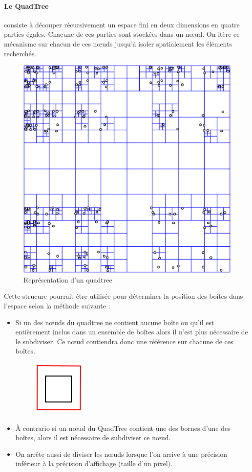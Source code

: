 \paragraph{Le QuadTree}\label{par:QT}consiste à découper récursivement un espace fini en deux dimensions en quatre parties égales. Chacune de ces parties sont stockées dans un nœud. On itère ce mécanisme sur chacun de ces nœuds jusqu'à isoler spatialement les éléments recherchés.
\begin{figure}[htbp]
\centering
\includegraphics[scale=0.50]{quadtree}
\caption{Représentation d'un quadtree}
\end{figure}
Cette strucure pourrait être utilisée pour déterminer la position des boîtes dans l'espace selon la méthode suivante :
\begin{itemize}
\item []Si un des nœuds du quadtree ne contient aucune boîte ou qu'il est entièrement inclus dans un ensemble de boîtes alors il n'est plus nécessaire de le subdiviser. Ce nœud contiendra donc une référence sur chacune de ces boîtes.
\begin{figure}[htbp]
\centering
\includegraphics[scale=0.20]{img/QT1}
\end{figure}
\item \`A contrario si un nœud du QuadTree contient une des bornes d'une des boîtes, alors il est nécessaire de subdiviser ce nœud.
\item On arrête aussi de diviser les nœuds lorsque l'on arrive à une précision inférieur à la précision d'affichage (taille d'un pixel).
\end{itemize}

